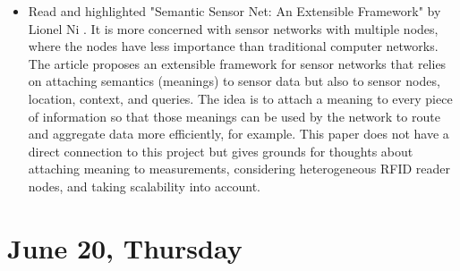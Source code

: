 \documentclass[a4paper,12pt]{article}
\begin{document}
\begin{itemize}
	\item Read and highlighted "Semantic Sensor Net: An Extensible Framework" by Lionel Ni \cite{Ni2005}. It is more concerned with sensor networks with multiple nodes, where the nodes have less importance than traditional computer networks. The article proposes an extensible framework for sensor networks that relies on attaching semantics (meanings) to sensor data but also to sensor nodes, location, context, and queries. The idea is to attach a meaning to every piece of information so that those meanings can be used by the network to route and aggregate data more efficiently, for example. This paper does not have a direct connection to this project but gives grounds for thoughts about attaching meaning to measurements, considering heterogeneous RFID reader nodes, and taking scalability into account.
	
\end{itemize}

\section{June 20, Thursday}
\end{document}
